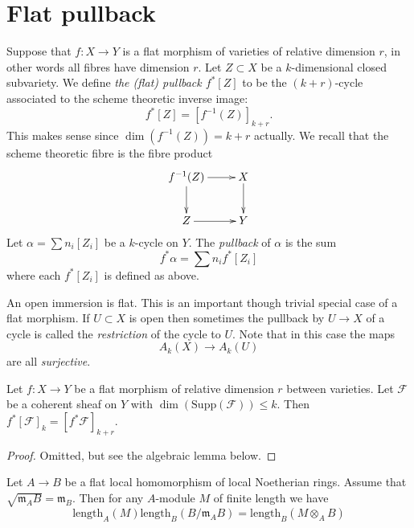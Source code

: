 \section{Flat pullback}
\label{section-flat-pullback}

\noindent
Suppose that $f : X \to Y$ is a flat morphism
of varieties of relative dimension $r$,
in other words all fibres have dimension $r$.
Let $Z \subset X$ be a $k$-dimensional closed subvariety. We define
{\it the (flat) pullback $f^*[Z]$} to be the
$(k+r)$-cycle associated to the scheme theoretic inverse image:
$$
f^*[Z] = [f^{-1}(Z)]_{k+r}.
$$
This makes sense since $\dim(f^{-1}(Z)) = k + r$ actually.
We recall that the scheme theoretic fibre is the fibre product
$$
\xymatrix{
f^{-1}(Z) \ar[r] \ar[d] & X \ar[d] \\
Z \ar[r] & Y
}
$$
Let $\alpha = \sum n_i [Z_i]$ be
a $k$-cycle on $Y$. The {\it pullback} of $\alpha$ is the sum
$$
f^* \alpha = \sum n_i f^*[Z_i]
$$
where each $f^*[Z_i]$ is defined as above.

\begin{remark}
\label{remark-open-immersion-flat}
An open immersion is flat. This is an important though trivial special
case of a flat morphism. If $U \subset X$ is open then sometimes the
pullback by $U \to X$ of a cycle is called the {\it restriction} of the
cycle to $U$. Note that in this case the maps
$$
A_k(X) \longrightarrow A_k(U)
$$
are all {\it surjective}.
\end{remark}

\begin{lemma}
\label{lemma-pullback-coherent}
Let $f : X \to Y$ be a flat morphism of relative dimension $r$ between
varieties. Let $\mathcal{F}$ be a coherent sheaf on $Y$ with
$\dim(\text{Supp}(\mathcal{F})) \leq k$.
Then $f^*[{\mathcal F}]_k = [f^*{\mathcal F}]_{k+r}$.
\end{lemma}

\begin{proof}
Omitted, but see the algebraic lemma below.
\end{proof}

\begin{lemma}
\label{lemma-pullback-coherent-algebra}
Let $A \to B$ be a flat local homomorphism of local Noetherian rings.
Assume that $\sqrt{\mathfrak m_A B} = \mathfrak m_B$.
Then for any $A$-module $M$ of finite length we have
$$
\text{length}_A(M) \text{length}_B(B/\mathfrak m_AB)
= \text{length}_B(M \otimes_A B)
$$
\end{lemma}


